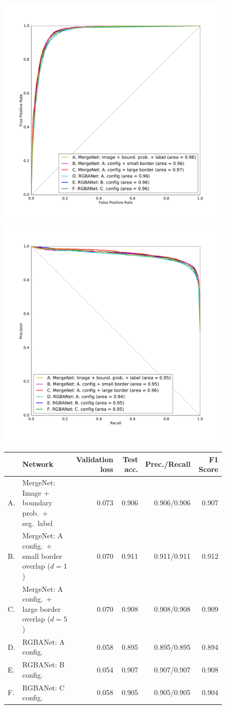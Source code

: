 \begin{figure}[ht]
\begin{floatrow}

\includegraphics[width=.5\textwidth]{gfx/roc_plot.pdf}
\includegraphics[width=.5\textwidth]{gfx/pr_plot.pdf}
\end{floatrow}

\begin{tabular}{ll rrrr}
\toprule
& Network & Validation loss & Test acc. & Prec./Recall & \hspace{0.1cm} F1 Score \\
\midrule
A.& MergeNet: Image + boundary prob.\ + seg.\ label & 0.073 & 0.906 & 0.906/0.906 & 0.907 \\
B.& MergeNet: A config.\ + small border overlap ($d=1$) & 0.070 & 0.911 & 0.911/0.911 & 0.912 \\
C.& MergeNet: A config.\ + large border overlap ($d=5$) & 0.070 & 0.908 & 0.908/0.908 & 0.909 \\
D.& RGBANet: A config.\ & 0.058 & 0.895 & 0.895/0.895 & 0.894 \\
E.& RGBANet: B config.\ & 0.054 & 0.907 & 0.907/0.907 & 0.908 \\
F.& RGBANet: C config.\ & 0.058 & 0.905 & 0.905/0.905 & 0.904\\
\bottomrule
\end{tabular}


\end{figure}
